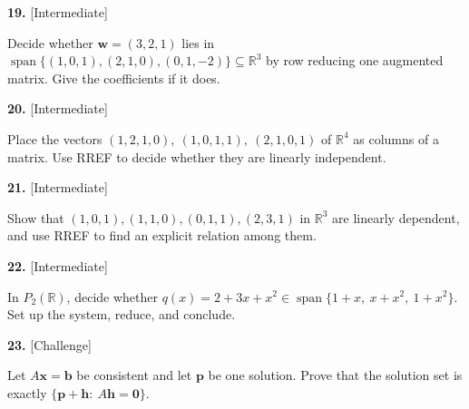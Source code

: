 \documentclass[11pt]{article}
\begin{document}
\begin{minipage}{\linewidth}\textbf{19.} \hfill{\scriptsize\color{ink}[Intermediate]}\par\nopagebreak Decide whether $\mathbf w=(3,2,1)$ lies in $\operatorname{span}\{(1,0,1),(2,1,0),(0,1,-2)\}\subseteq\mathbb{R}^{3}$ by row reducing one augmented matrix. Give the coefficients if it does.
\vspace{4.3cm}\end{minipage}\par\vspace{4pt}
\begin{minipage}{\linewidth}\textbf{20.} \hfill{\scriptsize\color{ink}[Intermediate]}\par\nopagebreak Place the vectors $(1,2,1,0),\ (1,0,1,1),\ (2,1,0,1)$ of $\mathbb{R}^{4}$ as columns of a matrix. Use RREF to decide whether they are linearly independent.
\vspace{4.1cm}\end{minipage}\par\vspace{4pt}
\begin{minipage}{\linewidth}\textbf{21.} \hfill{\scriptsize\color{ink}[Intermediate]}\par\nopagebreak Show that $(1,0,1),(1,1,0),(0,1,1),(2,3,1)$ in $\mathbb{R}^{3}$ are linearly dependent, and use RREF to find an explicit relation among them.
\vspace{4.4cm}\end{minipage}\par\vspace{4pt}
\begin{minipage}{\linewidth}\textbf{22.} \hfill{\scriptsize\color{ink}[Intermediate]}\par\nopagebreak In $P_{2}(\mathbb{R})$, decide whether $q(x)=2+3x+x^{2}\in\operatorname{span}\{1+x,\ x+x^{2},\ 1+x^{2}\}$. Set up the system, reduce, and conclude.
\vspace{4.4cm}\end{minipage}\par\vspace{4pt}
\begin{minipage}{\linewidth}\textbf{23.} \hfill{\scriptsize\color{ink}[Challenge]}\par\nopagebreak Let $A\mathbf x=\mathbf b$ be consistent and let $\mathbf p$ be one solution. Prove that the solution set is exactly $\{\mathbf p+\mathbf h:\ A\mathbf h=\mathbf 0\}$.
\vspace{3.9cm}\end{minipage}\par\vspace{4pt}
\end{document}
